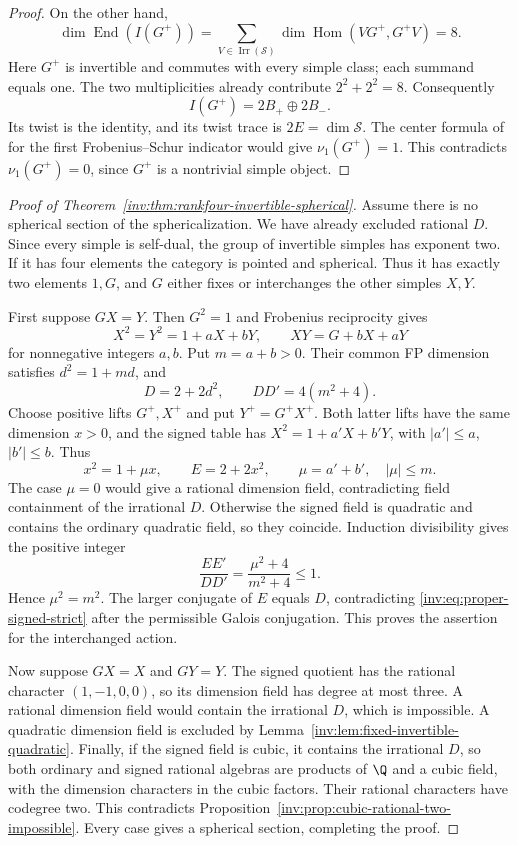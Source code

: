 \begin{proof}
On the other hand,
\[
 \dim\operatorname{End}(I(G^+))
 =\sum_{V\in\operatorname{Irr}(\mathcal S)}
       \dim\operatorname{Hom}(VG^+,G^+V)=8.
\]
Here $G^+$ is invertible and commutes with every simple class; each
summand equals one. The two multiplicities already contribute
$2^2+2^2=8$. Consequently
\[
 I(G^+)=2B_+\oplus2B_-.
\]
Its twist is the identity, and its twist trace is $2E=\dim\mathcal S$.
The center formula of \cite[Theorem~4.1]{NS} for the first Frobenius--Schur indicator would give
$\nu_1(G^+)=1$. This contradicts $\nu_1(G^+)=0$, since $G^+$ is a
nontrivial simple object.
\end{proof}


\begin{proof}[Proof of Theorem~\ref{inv:thm:rankfour-invertible-spherical}]
Assume there is no spherical section of the sphericalization. We have
already excluded rational $D$. Since every simple is self-dual, the
group of invertible simples has exponent two. If it has four elements
the category is pointed and spherical. Thus it has exactly two
elements $1,G$, and $G$ either fixes or interchanges the other simples
$X,Y$.

First suppose $GX=Y$. Then $G^2=1$ and Frobenius reciprocity gives
\[
 X^2=Y^2=1+aX+bY,\qquad XY=G+bX+aY
\]
for nonnegative integers $a,b$. Put $m=a+b>0$. Their common FP
dimension satisfies $d^2=1+md$, and
\[
 D=2+2d^2,\qquad DD'=4(m^2+4).
\]
Choose positive lifts $G^+,X^+$ and put $Y^+=G^+X^+$. Both latter
lifts have the same dimension $x>0$, and the signed table has
$X^2=1+a'X+b'Y$, with $|a'|\leq a$, $|b'|\leq b$. Thus
\[
 x^2=1+\mu x,\qquad E=2+2x^2,\qquad
 \mu=a'+b',\quad |\mu|\leq m.
\]
The case $\mu=0$ would give a rational dimension field, contradicting
field containment of the irrational $D$. Otherwise the signed
field is quadratic and contains the ordinary quadratic field, so they
coincide. Induction divisibility gives the positive integer
\[
 \frac{EE'}{DD'}=\frac{\mu^2+4}{m^2+4}\leq1.
\]
Hence $\mu^2=m^2$. The larger conjugate of $E$ equals $D$, contradicting
\eqref{inv:eq:proper-signed-strict} after the permissible Galois conjugation.
This proves the assertion for the interchanged action.

Now suppose $GX=X$ and $GY=Y$. The signed quotient has the rational
character $(1,-1,0,0)$, so its dimension field has degree at most three.
A rational dimension field would contain the irrational $D$, which is
impossible. A quadratic dimension field is excluded by
Lemma~\ref{inv:lem:fixed-invertible-quadratic}. Finally, if the signed
field is cubic, it contains the irrational $D$, so both ordinary and
signed rational algebras are products of $\Q$ and a cubic
field, with the dimension characters in the cubic factors. Their
rational characters have codegree two. This contradicts
Proposition~\ref{inv:prop:cubic-rational-two-impossible}.
Every case gives a spherical section, completing the proof.
\end{proof}


